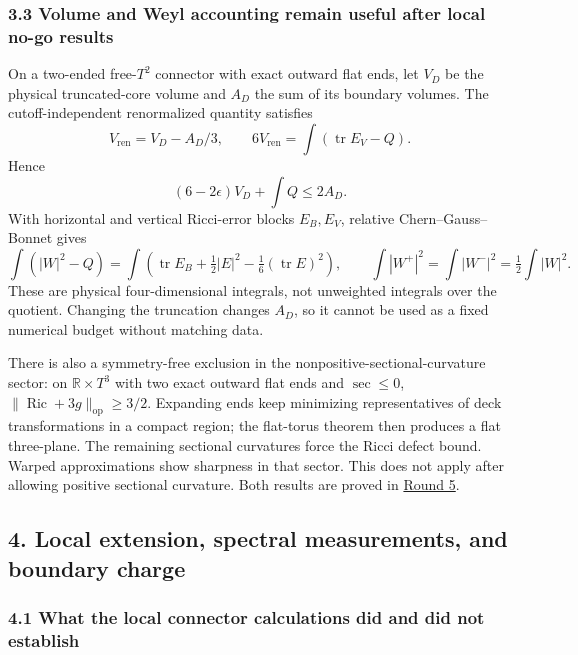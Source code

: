 \documentclass[
  english,
]{article}
\begin{document}
\hypertarget{volume-and-weyl-accounting-remain-useful-after-local-no-go-results}{%
\subsubsection{3.3 Volume and Weyl accounting remain useful after local
no-go
results}\label{volume-and-weyl-accounting-remain-useful-after-local-no-go-results}}

On a two-ended free-\(T^2\) connector with exact outward flat ends, let
\(V_D\) be the physical truncated-core volume and \(A_D\) the sum of its
boundary volumes. The cutoff-independent renormalized quantity satisfies
\[
 V_{\mathrm{ren}}=V_D-A_D/3,\qquad
 6V_{\mathrm{ren}}=\int(\operatorname{tr}E_V-Q).
\] Hence \[
 (6-2\epsilon)V_D+\int Q\le2A_D.
\] With horizontal and vertical Ricci-error blocks \(E_B,E_V\), relative
Chern--Gauss--Bonnet gives \[
 \int(|W|^2-Q)
 =\int\left(\operatorname{tr}E_B+\tfrac12|E|^2-\tfrac16(\operatorname{tr}E)^2\right),
 \qquad \int|W^+|^2=\int|W^-|^2=\tfrac12\int|W|^2.
\] These are physical four-dimensional integrals, not unweighted
integrals over the quotient. Changing the truncation changes \(A_D\), so
it cannot be used as a fixed numerical budget without matching data.

There is also a symmetry-free exclusion in the
nonpositive-sectional-curvature sector: on \(\mathbb R\times T^3\) with
two exact outward flat ends and \(\sec\le0\),
\(\|\operatorname{Ric}+3g\|_{\mathrm{op}}\ge3/2\). Expanding ends keep
minimizing representatives of deck transformations in a compact region;
the flat-torus theorem then produces a flat three-plane. The remaining
sectional curvatures force the Ricci defect bound. Warped approximations
show sharpness in that sector. This does not apply after allowing
positive sectional curvature. Both results are proved in
\href{../proofs/round5_global.md}{Round 5}.

\hypertarget{local-extension-spectral-measurements-and-boundary-charge}{%
\subsection{4. Local extension, spectral measurements, and boundary
charge}\label{local-extension-spectral-measurements-and-boundary-charge}}

\hypertarget{what-the-local-connector-calculations-did-and-did-not-establish}{%
\subsubsection{4.1 What the local connector calculations did and did not
establish}\label{what-the-local-connector-calculations-did-and-did-not-establish}}
\end{document}
